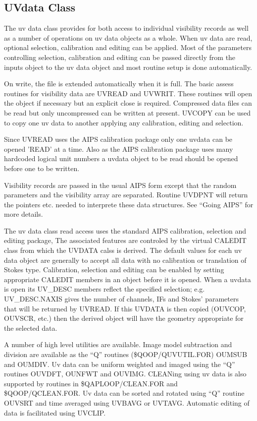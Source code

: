 \subsection{UVdata Class}

   The uv data class provides for both access to individual visibility
records as well as a number of operations on uv data objects as a
whole.  When uv data are read, optional selection,
calibration and editing can be applied.  Most of the parameters
controlling selection, calibration and editing can be passed directly
from the inputs object to the uv data object and most routine setup is
done automatically.

   On write, the file is extended automatically when it is full.  The
basic assess routines for visibility data are UVREAD and UVWRIT.
These routines will open the object if necessary but an explicit close
is required.  Compressed data files can be read but only uncompressed
can be written at present.  UVCOPY can be used to copy one uv data to
another applying any calibration, editing and selection.

   Since UVREAD uses the AIPS calibration package only one uvdata can
be opened 'READ' at a time.  Also as the AIPS calibration package uses
many hardcoded logical unit numbers a uvdata object to be read should
be opened before one to be written.

   Visibility records are passed in the usual AIPS form except that
the random parameters and the visibility array are separated.  Routine
UVDPNT will return the pointers etc. needed to interprete these data
structures. See ``Going AIPS'' for more details.


   The uv data class read access uses the standard AIPS calibration,
selection and editing package,  The associated features are controled
by the virtual CALEDIT class from which the UVDATA calss is derived.
The default values for each uv data object are generally to accept all
data with no calibration or translation of Stokes type.  Calibration,
selection and editing can be enabled by setting appropriate CALEDIT
members in an object before it is opened.  When a uvdata is open its
UV\_DESC members reflect the specified selection; e.g. UV\_DESC.NAXIS
gives the number of channels, IFs and Stokes' parameters that will be
returned by UVREAD.  If this UVDATA is then copied (OUVCOP, OUVSCR,
etc.) then the derived object will have the geometry appropriate for
the selected data.

   A number of high level utilities are available.  Image model
subtraction and division are available as the ``Q'' routines
(\$QOOP/QUVUTIL.FOR) OUMSUB and OUMDIV.  Uv data can be uniform
weighted and imaged using the ``Q'' routines OUVDFT, OUNFWT and
OUVIMG.  CLEANing using uv data is also supported by routines in
\$QAPLOOP/CLEAN.FOR and \$QOOP/QCLEAN.FOR.
Uv data can be sorted and rotated using ``Q''
routine OUVSRT and time averaged using UVBAVG or UVTAVG.  Automatic
editing of data is facilitated using UVCLIP.


